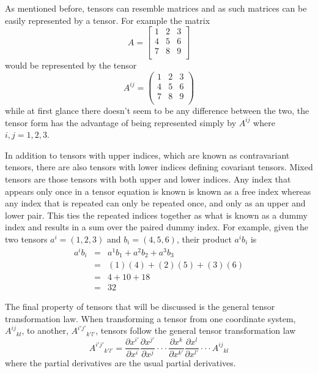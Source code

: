 \documentclass[12pt, oneside]{smuthesis}
\newcommand{\mixtensor}[3]{{#1}^{#2}{}_{#3}}
\newcommand{\contensor}[2]{{#1}^{#2}}
\newcommand{\covtensor}[2]{{#1}_{#2}}
\begin{document}
As mentioned before, tensors can resemble matrices and as such matrices can be easily represented by a tensor. For example the matrix
\begin{equation}
\nonumber
A=
\begin{bmatrix}
1 & 2 & 3 \\
4 & 5 & 6 \\
7 & 8 & 9 \\
\end{bmatrix}
\end{equation}
would be represented by the tensor
\begin{equation}
\nonumber
\contensor{A}{ij}=
\begin{pmatrix}
1 & 2 & 3 \\
4 & 5 & 6 \\
7 & 8 & 9 \\
\end{pmatrix}
\end{equation}
while at first glance there doesn't seem to be any difference between the two, the tensor form has the advantage of being represented simply by $\contensor{A}{ij}$ where $i,j=1,2,3$.

In addition to tensors with upper indices, which are known as contravariant tensors, there are also tensors with lower indices defining covariant tensors. Mixed tensors are those tensors with both upper and lower indices. Any index that appears only once in a tensor equation is known is known as a free index whereas any index that is repeated can only be repeated once, and only as an upper and lower pair. This ties the repeated indices together as what is known as a dummy index and results in a sum over the paired dummy index. For example, given the two tensors $\contensor{a}{i}=\left(1, 2, 3\right)$ and $\covtensor{b}{i}=\left(4, 5, 6\right)$, their product $\contensor{a}{i}\covtensor{b}{i}$ is
\begin{eqnarray}
\nonumber
\contensor{a}{i}\covtensor{b}{i} &  = & \contensor{a}{1}\covtensor{b}{1} + \contensor{a}{2}\covtensor{b}{2} + \contensor{a}{3}\covtensor{b}{3}\\\nonumber
& = & (1)(4) + (2)(5) + (3)(6)\\\nonumber
& = & 4 + 10 + 18\\\nonumber
& = & 32
\end{eqnarray}

The final property of tensors that will be discussed is the general tensor transformation law. When transforming a tensor from one coordinate system, $\mixtensor{A}{ij}{kl}$, to another, $\mixtensor{A}{i'j'}{k'l'}$, tensors follow the general tensor transformation law
\begin{equation}
\mixtensor{A}{i'j'}{k'l'}=\frac{\partial x^{i'}}{\partial x^{i}}\frac{\partial x^{j'}}{\partial x^{j}}\cdot\cdot\cdot\frac{\partial x^{k}}{\partial x^{k'}}\frac{\partial x^{l}}{\partial x^{l'}}\cdot\cdot\cdot\mixtensor{A}{ij}{kl}
\end{equation} \label{eqn:tentran}
where the partial derivatives are the usual partial derivatives.
\end{document}
